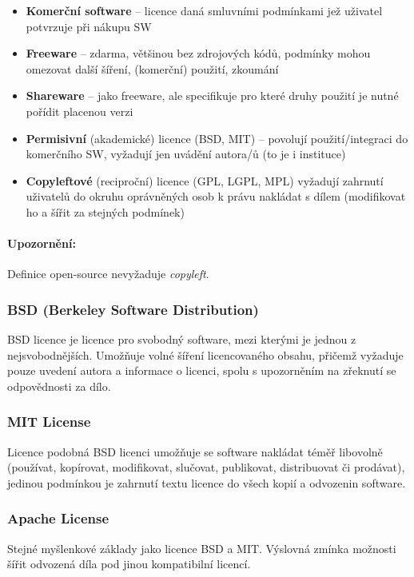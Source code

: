 \begin{itemize}[itemsep=0px]
\item \textbf{Komerční software} – licence daná smluvními podmínkami jež uživatel potvrzuje při nákupu SW
\item \textbf{Freeware} – zdarma, většinou bez zdrojových kódů, podmínky mohou omezovat další šíření, (komerční) použití, zkoumání
\item \textbf{Shareware} – jako freeware, ale specifikuje pro které druhy použití je nutné pořídit placenou verzi
\item \textbf{Permisivní} (akademické) licence (BSD, MIT) – povolují použití/integraci do komerčního SW, vyžadují jen uvádění autora/ů (to je i instituce)
\item \textbf{Copyleftové} (reciproční) licence (GPL, LGPL, MPL)
vyžadují zahrnutí uživatelů do okruhu oprávněných osob k právu nakládat s dílem (modifikovat ho a šířit za stejných podmínek)
\end{itemize}
\paragraph{Upozornění:} Definice open-source nevyžaduje \textit{copyleft}.

\subsubsection{BSD (Berkeley Software Distribution)}
BSD licence je licence pro svobodný software, mezi kterými je jednou z nejsvobodnějších. Umožňuje volné šíření licencovaného obsahu, přičemž vyžaduje pouze uvedení autora a informace o licenci, spolu s upozorněním na zřeknutí se odpovědnosti za dílo.

\subsubsection{MIT License}

Licence podobná BSD licenci umožňuje se software nakládat téměř libovolně (používat, kopírovat, modifikovat, slučovat, publikovat, distribuovat či prodávat), jedinou podmínkou je zahrnutí textu licence do všech kopií a odvozenin software.

\subsubsection{Apache License}
Stejné myšlenkové základy jako licence BSD a MIT. Výslovná zmínka možnosti šířit odvozená díla pod jinou kompatibilní licencí.

